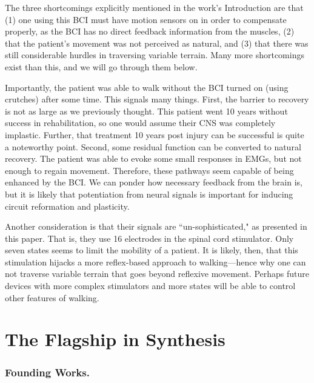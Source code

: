 The three shortcomings explicitly mentioned in the work's Introduction are that (1) one using this BCI must have motion sensors on in order to compensate properly, as the BCI has no direct feedback information from the muscles, (2) that the patient's movement was not perceived as natural, and (3) that there was still considerable hurdles in traversing variable terrain. Many more shortcomings exist than this, and we will go through them below.\newline

Importantly, the patient was able to walk without the BCI turned on (using crutches) after some time. This signals many things. First, the barrier to recovery is not as large as we previously thought. This patient went 10 years without success in rehabilitation, so one would assume their CNS was completely implastic. Further, that treatment 10 years post injury can be successful is quite a noteworthy point. Second, some residual function can be converted to natural recovery. The patient was able to evoke some small responses in EMGs, but not enough to regain movement. Therefore, these pathways seem capable of being enhanced by the BCI. We can ponder how necessary feedback from the brain is, but it is likely that potentiation from neural signals is important for inducing circuit reformation and plasticity.\newline

 Another consideration is that their signals are ``un-sophisticated," as presented in this paper.  That is, they use 16 electrodes in the spinal cord stimulator. Only seven states seems to limit the mobility of a patient. It is likely, then, that this stimulation hijacks a more reflex-based approach to walking---hence why one can not traverse variable terrain that goes beyond reflexive movement. Perhaps future devices with more complex stimulators and more states will be able to control other features of walking. 


\section{The Flagship in Synthesis}

\subsubsection{Founding Works.}

